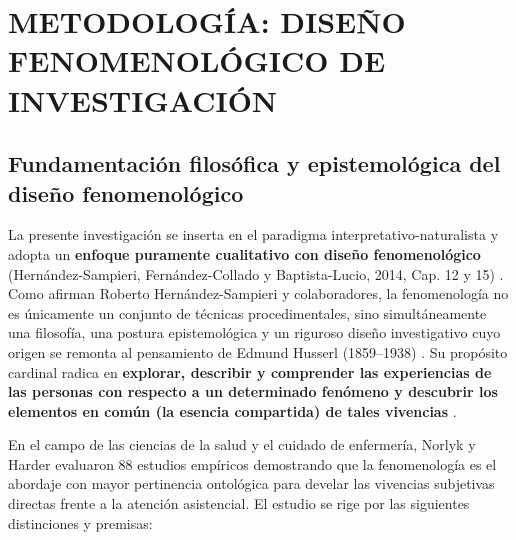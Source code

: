 \section{METODOLOGÍA: DISEÑO FENOMENOLÓGICO DE INVESTIGACIÓN}
\label{sec:cap4_metodologia}

\subsection{Fundamentación filosófica y epistemológica del diseño fenomenológico}
\label{sec:4.1_enfoque}
La presente investigación se inserta en el paradigma interpretativo-naturalista y adopta un \textbf{enfoque puramente cualitativo con diseño fenomenológico} (Hernández-Sampieri, Fernández-Collado y Baptista-Lucio, 2014, Cap. 12 y 15) \cite{sampieri2018}. Como afirman Roberto Hernández-Sampieri y colaboradores, la fenomenología no es únicamente un conjunto de técnicas procedimentales, sino simultáneamente una filosofía, una postura epistemológica y un riguroso diseño investigativo cuyo origen se remonta al pensamiento de Edmund Husserl (1859--1938) \cite{husserl1949}. Su propósito cardinal radica en \textbf{explorar, describir y comprender las experiencias de las personas con respecto a un determinado fenómeno y descubrir los elementos en común (la esencia compartida) de tales vivencias} \cite{sampieri2018}.

En el campo de las ciencias de la salud y el cuidado de enfermería, Norlyk y Harder \cite{norlyk2010} evaluaron 88 estudios empíricos demostrando que la fenomenología es el abordaje con mayor pertinencia ontológica para develar las vivencias subjetivas directas frente a la atención asistencial. El estudio se rige por las siguientes distinciones y premisas:

